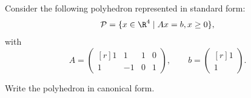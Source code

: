 
Consider the following polyhedron represented in standard form:
\[
 \mathcal{P} = \{x \in \R^4 \mid Ax = b, x \geq 0\},
\]
with
\[
 A = \begin{pmatrix*}[r] 1 & 1 & 1 & 0 \\  1 & -1 & 0 & 1 \end{pmatrix*}, \qquad b = \begin{pmatrix*}[r] 1 \\ 1 \end{pmatrix*}. 
\]

 Write the polyhedron in canonical form.




